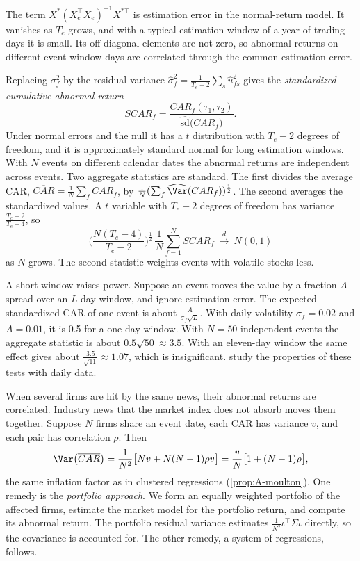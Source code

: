 The term $X^*(X_e^\top X_e)^{-1}X^{*\top}$ is estimation error in the normal-return model. It vanishes as $T_e$
grows, and with a typical estimation window of a year of trading days it is small. Its off-diagonal elements are not
zero, so abnormal returns on different event-window days are correlated through the common estimation error.

Replacing $\sigma_f^2$ by the residual variance $\hat\sigma_f^2=\frac{1}{T_e-2}\sum_s\hat u_{fs}^2$ gives the
\emph{standardized cumulative abnormal return}
\begin{equation*}
SCAR_f=\frac{CAR_f(\tau_1,\tau_2)}{\widehat{\mathrm{sd}}\big(CAR_f\big)} .
\end{equation*}
Under normal errors and the null it has a $t$ distribution with $T_e-2$ degrees of freedom, and it is approximately
standard normal for long estimation windows. With $N$ events on different calendar dates the abnormal returns are
independent across events. Two aggregate statistics are standard. The first divides the average CAR,
$\overline{CAR}=\frac{1}{N}\sum_fCAR_f$, by $\frac{1}{N}(\sum_f\widehat{\Var}(CAR_f))^{\frac{1}{2}}$. The second
averages the standardized values. A $t$ variable with $T_e-2$ degrees of freedom has variance $\frac{T_e-2}{T_e-4}$, so
\begin{equation*}
\Big(\frac{N(T_e-4)}{T_e-2}\Big)^{\frac{1}{2}}\,\frac{1}{N}\sum_{f=1}^{N}SCAR_f\ \xrightarrow{d}\ N(0,1)
\end{equation*}
as $N$ grows. The second statistic weights events with volatile stocks less.

A short window raises power. Suppose an event moves the value by a fraction $A$ spread over an $L$-day window, and
ignore estimation error. The expected standardized CAR of one event is about $\frac{A}{\sigma_f\sqrt L}$. With daily
volatility $\sigma_f=0.02$ and $A=0.01$, it is 0.5 for a one-day window. With $N=50$ independent events the aggregate
statistic is about $0.5\sqrt{50}\approx3.5$. With an eleven-day window the same effect gives about
$\frac{3.5}{\sqrt{11}}\approx1.07$, which is insignificant. \citet{BrownWarner1985} study the properties of these
tests with daily data.

When several firms are hit by the same news, their abnormal returns are correlated. Industry news that the market
index does not absorb moves them together. Suppose $N$ firms share an event date, each CAR has variance $v$, and each
pair has correlation $\rho$. Then
\begin{equation*}
\Var\big(\overline{CAR}\big)=\frac{1}{N^2}\big[Nv+N(N-1)\rho v\big]=\frac{v}{N}\big[1+(N-1)\rho\big],
\end{equation*}
the same inflation factor as in clustered regressions (\cref{prop:A-moulton}). One remedy is the \emph{portfolio
approach}. We form an equally weighted portfolio of the affected firms, estimate the market model for the portfolio
return, and compute its abnormal return. The portfolio residual variance estimates
$\frac{1}{N^2}\iota^\top\Sigma\iota$ directly, so the covariance is accounted for. The other remedy, a system of
regressions, follows.

